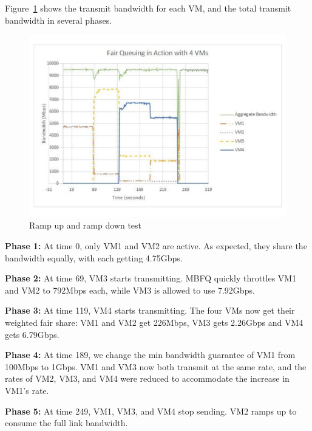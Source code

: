 Figure~\ref{fairsharing}  shows the transmit bandwidth for each VM, and the
total transmit bandwidth in several phases. 

\begin{figure}[h]
\centering
\includegraphics[width=0.8\columnwidth,trim=60pt 20mm 0pt 8mm]{figures/fairsharing}
\caption{Ramp up and ramp down test}
\label{fairsharing}
\vspace{-3mm}
\end{figure}

{\bf Phase 1:}  At time 0, only VM1 and VM2 are active. As expected, they share
the bandwidth equally, with each getting 4.75Gbps.

{\bf Phase 2:} At time 69, VM3 starts transmitting. MBFQ quickly
throttles VM1 and VM2 to 792Mbps each, while VM3 is allowed to use 7.92Gbps. 

{\bf  Phase 3:} At time 119, VM4 starts transmitting. The four VMs now
get their weighted fair share: VM1 and VM2 get 226Mbps, VM3
gets 2.26Gbps and VM4 gets 6.79Gbps. 

{\bf  Phase 4:} At time 189, we change the min bandwidth guarantee of VM1 from
100Mbps to 1Gbps. VM1 and VM3 now both transmit at the same rate, and the rates
of VM2, VM3, and VM4 were reduced to accommodate the increase in VM1's rate.

{\bf Phase 5:} At time 249, VM1, VM3, and VM4 stop sending. VM2
ramps up to consume the full link bandwidth.

